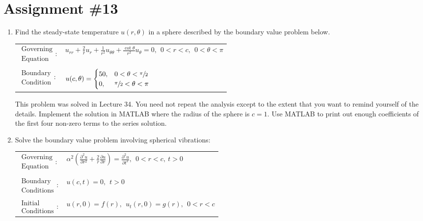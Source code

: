\chapter{Assignment \#13}
\label{ch:ass13}
\begin{fullwidth}

\begin{enumerate}

\item Find the steady-state temperature $u(r,\theta)$ in a sphere described by the boundary value problem below.

\begin{table}[h!]
\begin{tabular}{l l}
$\substack{\text{Governing} \\\text{Equation}}: $& $u_{rr} + \frac{2}{r}u_r + \frac{1}{r^2}u_{\theta \theta} + \frac{\cot{\theta}}{r^2}u_{\theta} = 0, \ \ 0<r<c, \ \ 0<\theta < \pi$ \\
& \\
$\substack{\text{Boundary} \\ \text{Condition}}: $& $u(c,\theta)= \begin{cases} 50, & 0 < \theta < \sfrac{\pi}{2} \\ 0, & \sfrac{\pi}{2} < \theta < \pi \end{cases} $\\
\end{tabular}
\end{table}

\noindent This problem was solved in Lecture 34. You need not repeat the analysis except to the extent that you want to remind yourself of the details.  Implement the solution in MATLAB where the radius of the sphere is $c=1$.  Use MATLAB to print out enough coefficients of the first four non-zero terms to the series solution.


\vspace{2.0cm}

\item Solve the boundary value problem involving spherical vibrations:
\begin{table}
\begin{tabular}{l l}
$\substack{\text{Governing} \\\text{Equation}}: $& $\alpha^2\left(\frac{\partial^2 u}{\partial r^2} + \frac{2}{r}\frac{\partial u}{\partial r}\right) = \frac{\partial^2 u}{\partial t^2}, \ \ 0<r<c, \ t>0$  \\
& \\
$\substack{\text{Boundary} \\ \text{Conditions}}: $& $u(c,t)=0, \ \ t>0$\\
& \\
$\substack{\text{Initial} \\ \text{Conditions}}: $ & $u(r,0) = f(r), \ \ u_{t}(r,0) = g(r), \ \ 0<r<c $ \\
\end{tabular}
\end{table}


\end{enumerate}
\end{fullwidth}
